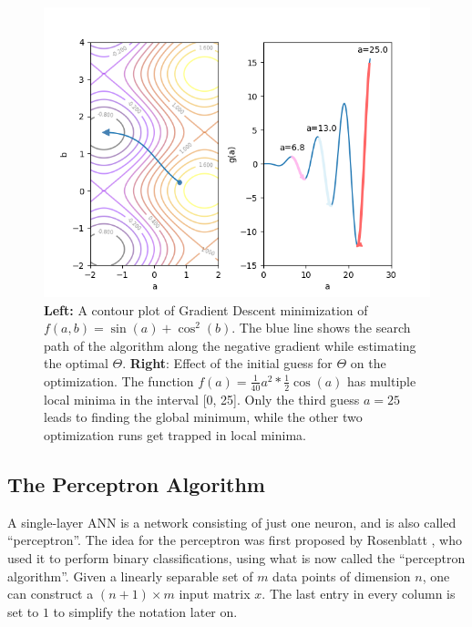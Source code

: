 \begin {figure}[!ht]
	\begin{center}
		\includegraphics[scale=0.9]{img/fig_grad_desc}
	\end{center}
	\caption{\textbf{Left:} A contour plot of Gradient Descent minimization of $f(a, b) = \sin(a) + \cos^2(b)$. The blue line shows the search path of the algorithm along the negative gradient while estimating the optimal $\Theta$. \textbf{Right}: Effect of the initial guess for $\Theta$ on the optimization. The function $f(a) = \frac{1}{40}a^2 * \frac{1}{2} \cos(a)$ has multiple local minima in the interval [0, 25]. Only the third guess $a=25$ leads to finding the global minimum, while the other two optimization runs get trapped in local minima.}
	\label{fig:grad_desc}
\end {figure}


	\subsection{The Perceptron Algorithm}
\label{subsec:perceptron_algo}

A single-layer ANN is a network consisting of just one neuron, and is also called ``perceptron''. The idea for the perceptron was first proposed by Rosenblatt \cite{rosenblatt_report, rosenblatt_book}, who used it to perform binary classifications, using what is now called the ``perceptron algorithm''. Given a linearly separable set of $m$ data points of dimension $n$, one can construct a $(n+1) \times m$ input matrix $x$. The last entry in every column is set to $1$ to simplify the notation later on.

